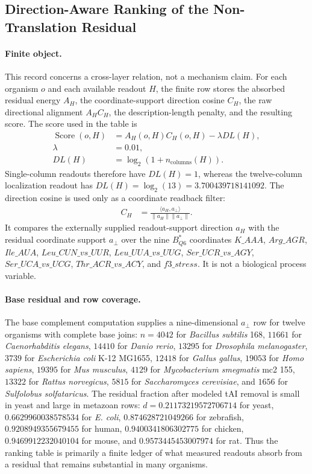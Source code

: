\subsection{Direction-Aware Ranking of the Non-Translation Residual}\label{sec:q6-h-ranking-table-direction-aware-cross-layer}

\paragraph{Finite object.}
This record concerns a cross-layer relation, not a mechanism claim.  For each organism $o$ and each available readout $H$, the finite row stores the absorbed residual energy $A_H$, the coordinate-support direction cosine $C_H$, the raw directional alignment $A_H C_H$, the description-length penalty, and the resulting score.  The score used in the table is
$$
\begin{aligned}
\operatorname{Score}(o,H) &= A_H(o,H) C_H(o,H)-\lambda DL(H),\\
\lambda &= 0.01,\\
DL(H) &= \log_2(1+n_{\mathrm{columns}}(H)).
\end{aligned}
$$
Single-column readouts therefore have $DL(H)=1$, whereas the twelve-column localization readout has $DL(H)=\log_2(13)=3.700439718141092$.  The direction cosine is used only as a coordinate readback filter:
$$
\begin{aligned}
C_H &= \frac{\langle a_H,a_{\perp}\rangle}{\lVert a_H\rVert\lVert a_{\perp}\rVert}.
\end{aligned}
$$
It compares the externally supplied readout-support direction $a_H$ with the residual coordinate support $a_{\perp}$ over the nine $B^*_{Q6}$ coordinates $K\_AAA$, $Arg\_AGR$, $Ile\_AUA$, $Leu\_CUN\_vs\_UUR$, $Leu\_UUA\_vs\_UUG$, $Ser\_UCR\_vs\_AGY$, $Ser\_UCA\_vs\_UCG$, $Thr\_ACR\_vs\_ACY$, and $f3\_stress$.  It is not a biological process variable.

\paragraph{Base residual and row coverage.}
The base complement computation supplies a nine-dimensional $a_{\perp}$ row for twelve organisms with complete base joins: $n=4042$ for \emph{Bacillus subtilis} 168, $11661$ for \emph{Caenorhabditis elegans}, $14410$ for \emph{Danio rerio}, $13295$ for \emph{Drosophila melanogaster}, $3739$ for \emph{Escherichia coli} K-12 MG1655, $12418$ for \emph{Gallus gallus}, $19053$ for \emph{Homo sapiens}, $19395$ for \emph{Mus musculus}, $4129$ for \emph{Mycobacterium smegmatis} mc2 155, $13322$ for \emph{Rattus norvegicus}, $5815$ for \emph{Saccharomyces cerevisiae}, and $1656$ for \emph{Sulfolobus solfataricus}.  The residual fraction after modeled tAI removal is small in yeast and large in metazoan rows: $d=0.21173219572706714$ for yeast, $0.6629960038578534$ for \emph{E. coli}, $0.874628721049266$ for zebrafish, $0.9208949355679455$ for human, $0.9400341806302775$ for chicken, $0.9469912232040104$ for mouse, and $0.9573445453007974$ for rat.  Thus the ranking table is primarily a finite ledger of what measured readouts absorb from a residual that remains substantial in many organisms.

